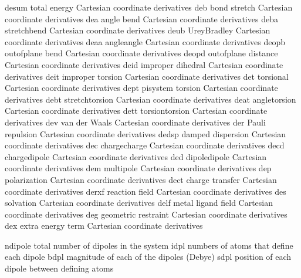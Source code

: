 \documentclass[letterpaper,11pt,english]{sphinxmanual}
\begin{document}

\begin{sphinxVerbatim}[commandchars=\\\{\}]
desum           total energy Cartesian coordinate derivatives
deb             bond stretch Cartesian coordinate derivatives
dea             angle bend Cartesian coordinate derivatives
deba            stretch\PYGZhy{}bend Cartesian coordinate derivatives
deub            Urey\PYGZhy{}Bradley Cartesian coordinate derivatives
deaa            angle\PYGZhy{}angle Cartesian coordinate derivatives
deopb           out\PYGZhy{}of\PYGZhy{}plane bend Cartesian coordinate derivatives
deopd           out\PYGZhy{}of\PYGZhy{}plane distance Cartesian coordinate derivatives
deid            improper dihedral Cartesian coordinate derivatives
deit            improper torsion Cartesian coordinate derivatives
det             torsional Cartesian coordinate derivatives
dept            pi\PYGZhy{}system torsion Cartesian coordinate derivatives
debt            stretch\PYGZhy{}torsion Cartesian coordinate derivatives
deat            angle\PYGZhy{}torsion Cartesian coordinate derivatives
dett            torsion\PYGZhy{}torsion Cartesian coordinate derivatives
dev             van der Waals Cartesian coordinate derivatives
der             Pauli repulsion Cartesian coordinate derivatives
dedsp           damped dispersion Cartesian coordinate derivatives
dec             charge\PYGZhy{}charge Cartesian coordinate derivatives
decd            charge\PYGZhy{}dipole Cartesian coordinate derivatives
ded             dipole\PYGZhy{}dipole Cartesian coordinate derivatives
dem             multipole Cartesian coordinate derivatives
dep             polarization Cartesian coordinate derivatives
dect            charge transfer Cartesian coordinate derivatives
derxf           reaction field Cartesian coordinate derivatives
des             solvation Cartesian coordinate derivatives
delf            metal ligand field Cartesian coordinate derivatives
deg             geometric restraint Cartesian coordinate derivatives
dex             extra energy term Cartesian coordinate derivatives
\end{sphinxVerbatim}


\begin{sphinxVerbatim}[commandchars=\\\{\}]
ndipole         total number of dipoles in the system
idpl            numbers of atoms that define each dipole
bdpl            magnitude of each of the dipoles (Debye)
sdpl            position of each dipole between defining atoms
\end{sphinxVerbatim}
\end{document}
